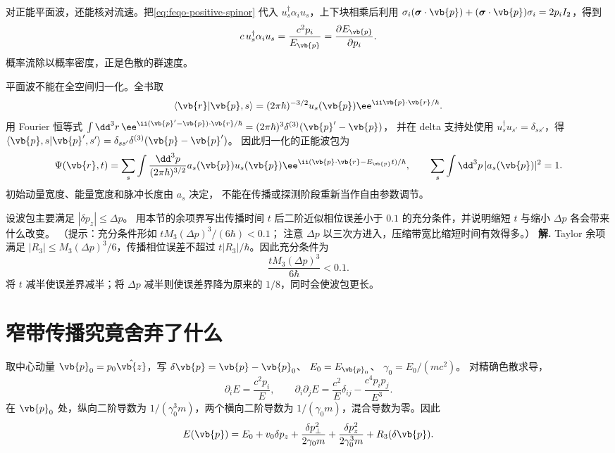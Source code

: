对正能平面波，还能核对流速。把\cref{eq:feqo-positive-spinor}
代入 \(u_s^\dagger\alpha_i u_s\)，上下块相乘后利用
\(\sigma_i(\boldsymbol\sigma\cdot\vb{p})
+(\boldsymbol\sigma\cdot\vb{p})\sigma_i=2p_iI_2\)，得到
\[
c\,u_s^\dagger\alpha_i u_s
=\frac{c^2p_i}{E_{\vb{p}}}
=\frac{\partial E_{\vb{p}}}{\partial p_i}.
\]
概率流除以概率密度，正是色散的群速度。

平面波不能在全空间归一化。全书取
\[
\langle\vb{r}|\vb{p},s\rangle
=(2\pi\hbar)^{-3/2}u_s(\vb{p})
\ee^{\ii\vb{p}\cdot\vb{r}/\hbar}.
\]
用 Fourier 恒等式
\(\int\dd^3r\,\ee^{\ii(\vb{p}'-\vb{p})\cdot\vb{r}/\hbar}
=(2\pi\hbar)^3\delta^{(3)}(\vb{p}'-\vb{p})\)，
并在 delta 支持处使用 \(u_s^\dagger u_{s'}=\delta_{ss'}\)，得
\(\langle\vb{p},s|\vb{p}',s'\rangle
=\delta_{ss'}\delta^{(3)}(\vb{p}-\vb{p}')\)。
因此归一化的正能波包为
\begin{equation}
\Psi(\vb{r},t)=
\sum_s\int\frac{\dd^3p}{(2\pi\hbar)^{3/2}}
a_s(\vb{p})u_s(\vb{p})
\ee^{\ii(\vb{p}\cdot\vb{r}-E_{\vb{p}}t)/\hbar},
\qquad
\sum_s\int\dd^3p\,|a_s(\vb{p})|^2=1.
\label{eq:feqo-positive-wavepacket}
\end{equation}
初始动量宽度、能量宽度和脉冲长度由 \(a_s\) 决定，
不能在传播或探测阶段重新当作自由参数调节。


\par
\begin{workedexample}
设波包主要满足 \(|\delta p_z|\le\Delta p\)。
用本节的余项界写出传播时间 \(t\) 后二阶近似相位误差小于
\(0.1\) 的充分条件，并说明缩短 \(t\) 与缩小 \(\Delta p\)
各会带来什么改变。
（提示：充分条件形如 \(tM_3(\Delta p)^3/(6\hbar)<0.1\)；
注意 \(\Delta p\) 以三次方进入，压缩带宽比缩短时间有效得多。）
\textbf{解.} Taylor 余项满足 \(|R_3|\le M_3(\Delta p)^3/6\)，传播相位误差不超过 \(t|R_3|/\hbar\)。因此充分条件为
\[
\frac{tM_3(\Delta p)^3}{6\hbar}<0.1.
\]
将 \(t\) 减半使误差界减半；将 \(\Delta p\) 减半则使误差界降为原来的 \(1/8\)，同时会使波包更长。
\end{workedexample}
\par
\section{窄带传播究竟舍弃了什么}
\label{sec:feqo-dispersion-expansion}

取中心动量 \(\vb{p}_0=p_0\hat{\vb{z}}\)，写
\(\delta\vb{p}=\vb{p}-\vb{p}_0\)、
\(E_0=E_{\vb{p}_0}\)、
\(\gamma_0=E_0/(mc^2)\)。
对精确色散求导，
\[
\partial_iE=\frac{c^2p_i}{E},\qquad
\partial_i\partial_jE
=\frac{c^2}{E}\delta_{ij}
-\frac{c^4p_ip_j}{E^3}.
\]
在 \(\vb{p}_0\) 处，纵向二阶导数为
\(1/(\gamma_0^3m)\)，两个横向二阶导数为
\(1/(\gamma_0m)\)，混合导数为零。因此
\begin{equation}
E(\vb{p})
=E_0+v_0\delta p_z
+\frac{\delta p_\perp^2}{2\gamma_0m}
+\frac{\delta p_z^2}{2\gamma_0^3m}
+R_3(\delta\vb{p}).
\label{eq:feqo-dispersion-hessian}
\end{equation}

